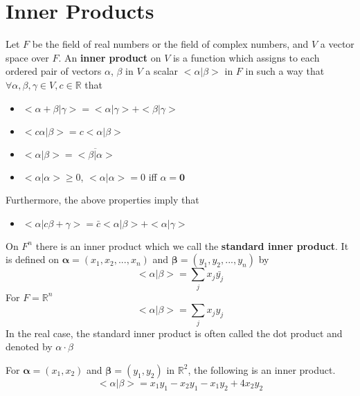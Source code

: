 		\section{Inner Products}
			\begin{definition}
				Let $F$ be the field of real numbers or the field of complex numbers, and $V$ a vector space over $F$. An \textbf{inner product} on $V$ is a function which assigns to each ordered pair of vectors $\alpha$, $\beta$ in $V$ a scalar $<\alpha|\beta>$ in $F$ in such a way that $\forall \alpha, \beta, \gamma \in V, c \in \mathbb{R}$ that
				\begin{itemize}
					\item $<\alpha+\beta|\gamma> = <\alpha|\gamma> + <\beta|\gamma>$
					\item $<c\alpha|\beta> = c<\alpha|\beta>$
					\item $<\alpha|\beta> = \overline{<\beta|\alpha>}$
					\item $<\alpha|\alpha> \ge 0$, $<\alpha|\alpha> = 0$ iff $\alpha = \mathbf{0}$
				\end{itemize}
				Furthermore, the above properties imply that
				\begin{itemize}
					\item $<\alpha|c\beta+\gamma> = \bar{c}<\alpha|\beta> + <\alpha|\gamma>$
				\end{itemize}
			\end{definition}

			\begin{definition}
				On $F^n$ there is an inner product which we call the \textbf{standard inner product}. It is defined on $\mathbf{\alpha} = (x_1, x_2, ..., x_n)$ and $\mathbf{\beta} = (y_1, y_2, ..., y_n)$ by
				\begin{equation}
					<\alpha|\beta> = \sum_j x_j \bar{y_j}
				\end{equation}
				For $F = \mathbb{R}^n$
				\begin{equation}
					<\alpha|\beta> = \sum_j x_j y_j
				\end{equation}
				In the real case, the standard inner product is often called the dot product and denoted by $\alpha \cdot \beta$
			\end{definition}

			\begin{example}
				For $\mathbf{\alpha} = (x_1, x_2)$ and $\mathbf{\beta} = (y_1, y_2)$ in $\mathbb{R}^2$, the following is an inner product.
				\begin{equation}
					<\alpha|\beta> = x_1y_1 - x_2y_1 - x_1y_2 + 4x_2y_2
				\end{equation}
			\end{example}

